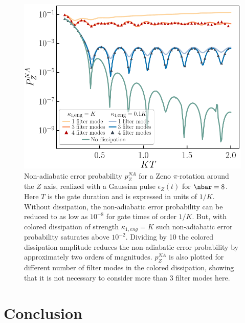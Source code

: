 \begin{figure}[t!]
    \includegraphics[width=\columnwidth]{file/image/Zgate_V2.pdf}
    \vspace{-0.6cm}
    \caption{\label{fig:Zgate}
    Non-adiabatic error probability $p_Z^{NA}$ for a Zeno $\pi$-rotation around the $Z$ axis, realized with a Gaussian pulse $\epsilon_Z(t)$ for $\nbar = 8$. Here $T$ is the gate duration and is expressed in units of $1/K$. Without dissipation, the non-adiabatic error probability can be reduced to as low as $10^{-8}$ for gate times of order $1/K$. But, with colored dissipation of strength $\kappa_{1,eng} = K$ such non-adiabatic error probability saturates above $10^{-2}$. Dividing by 10 the colored dissipation amplitude reduces the non-adiabatic error probability by approximately two orders of magnitudes. $p_Z^{NA}$ is also plotted for different number of filter modes in the colored dissipation, showing that it is not necessary to consider more than 3 filter modes here.
    }
\end{figure}


\section{\label{sec:level9}Conclusion}

